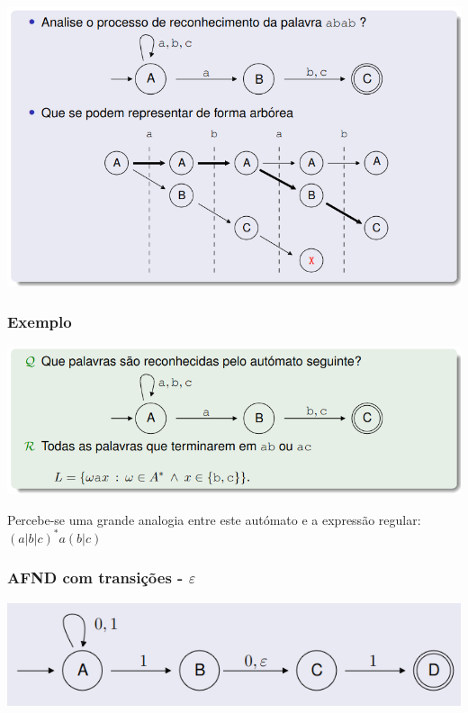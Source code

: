 \documentclass{article}
\begin{document}
\begin{flushleft}
  \begin{center}
    \includegraphics[scale=0.4]{48}
  \end{center}

  \pagebreak

  \subsubsection{Exemplo}

  \begin{center}
    \includegraphics[scale=0.4]{49}
  \end{center}

  Percebe-se uma grande analogia entre este autómato e a expressão regular: $(a|b|c)^* a(b|c)$

  \subsubsection{AFND com transições - $\varepsilon$}

  \begin{center}
    \includegraphics[scale=0.4]{50}
  \end{center}


\end{flushleft}
\end{document}
